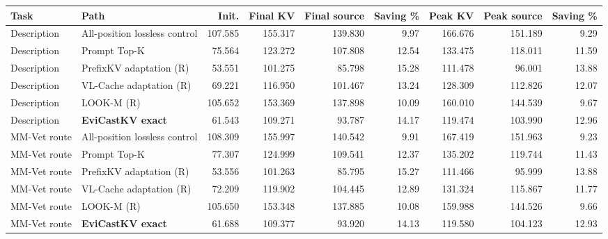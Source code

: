 \begin{tabular}{llrrrrrrr}
\toprule
Task & Path & Init. & Final KV & Final source & Saving \% & Peak KV & Peak source & Saving \%\\\midrule
Description & All-position lossless control & 107.585 & 155.317 & 139.830 & 9.97 & 166.676 & 151.189 & 9.29\\
Description & Prompt Top-K & 75.564 & 123.272 & 107.808 & 12.54 & 133.475 & 118.011 & 11.59\\
Description & PrefixKV adaptation (R) & 53.551 & 101.275 & 85.798 & 15.28 & 111.478 & 96.001 & 13.88\\
Description & VL-Cache adaptation (R) & 69.221 & 116.950 & 101.467 & 13.24 & 128.309 & 112.826 & 12.07\\
Description & LOOK-M (R) & 105.652 & 153.369 & 137.898 & 10.09 & 160.010 & 144.539 & 9.67\\
Description & \textbf{EviCastKV exact} & 61.543 & 109.271 & 93.787 & 14.17 & 119.474 & 103.990 & 12.96\\
MM-Vet route & All-position lossless control & 108.309 & 155.997 & 140.542 & 9.91 & 167.419 & 151.963 & 9.23\\
MM-Vet route & Prompt Top-K & 77.307 & 124.999 & 109.541 & 12.37 & 135.202 & 119.744 & 11.43\\
MM-Vet route & PrefixKV adaptation (R) & 53.556 & 101.263 & 85.795 & 15.27 & 111.466 & 95.999 & 13.88\\
MM-Vet route & VL-Cache adaptation (R) & 72.209 & 119.902 & 104.445 & 12.89 & 131.324 & 115.867 & 11.77\\
MM-Vet route & LOOK-M (R) & 105.650 & 153.348 & 137.885 & 10.08 & 159.988 & 144.526 & 9.66\\
MM-Vet route & \textbf{EviCastKV exact} & 61.688 & 109.377 & 93.920 & 14.13 & 119.580 & 104.123 & 12.93\\
\bottomrule
\end{tabular}
